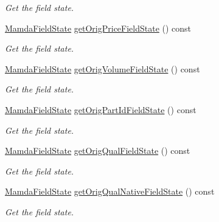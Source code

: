\begin{CompactItemize}
\begin{CompactList}\small\item\em Get the field state. \item\end{CompactList}\item 
\hyperlink{namespaceWombat_93aac974f2ab713554fd12a1fa3b7d2a}{Mamda\-Field\-State} \hyperlink{classWombat_1_1MamdaTradeListener_63ccde5fa2b5725b0b1c4efb0ef70880}{get\-Orig\-Price\-Field\-State} () const 
\begin{CompactList}\small\item\em Get the field state. \item\end{CompactList}\item 
\hyperlink{namespaceWombat_93aac974f2ab713554fd12a1fa3b7d2a}{Mamda\-Field\-State} \hyperlink{classWombat_1_1MamdaTradeListener_359006736d830e51323d578d45f7adc7}{get\-Orig\-Volume\-Field\-State} () const 
\begin{CompactList}\small\item\em Get the field state. \item\end{CompactList}\item 
\hyperlink{namespaceWombat_93aac974f2ab713554fd12a1fa3b7d2a}{Mamda\-Field\-State} \hyperlink{classWombat_1_1MamdaTradeListener_5e083be5035140d2130f39d19ad79829}{get\-Orig\-Part\-Id\-Field\-State} () const 
\begin{CompactList}\small\item\em Get the field state. \item\end{CompactList}\item 
\hyperlink{namespaceWombat_93aac974f2ab713554fd12a1fa3b7d2a}{Mamda\-Field\-State} \hyperlink{classWombat_1_1MamdaTradeListener_04acb5179a6d640a0a54fd30df321b85}{get\-Orig\-Qual\-Field\-State} () const 
\begin{CompactList}\small\item\em Get the field state. \item\end{CompactList}\item 
\hyperlink{namespaceWombat_93aac974f2ab713554fd12a1fa3b7d2a}{Mamda\-Field\-State} \hyperlink{classWombat_1_1MamdaTradeListener_3901e347c7b178d7c30d016180133738}{get\-Orig\-Qual\-Native\-Field\-State} () const 
\begin{CompactList}\small\item\em Get the field state. \item\end{CompactList}\item 

\end{CompactItemize}
